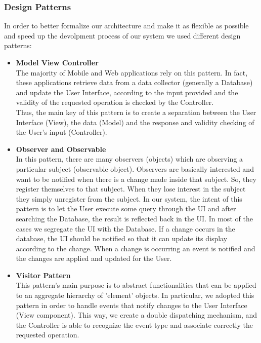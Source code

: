\documentclass[12pt,a4paper]{article}
\begin{document}
	\newpage
	\subsubsection{Design Patterns}
		In order to better formalize our architecture and make it as flexible as possible and speed up the devolpment process of our system we used different design patterns:
		\begin{itemize}
			\item \textbf{Model View Controller}\\ 
			The majority of Mobile and Web applications rely on this pattern. In fact, these applications retrieve data from a data collector (generally a Database) and update the User Interface, according to the input provided and the validity of the requested operation is checked by the Controller.\\
			Thus, the main key of this pattern is to create a separation between the User Interface (View), the data (Model) and the response and validity checking of the User's input (Controller).
			\item \textbf{Observer and Observable}\\
			In this pattern, there are many observers (objects) which are observing a particular subject (observable object). Observers are basically interested and want to be notified when there is a change made inside that subject. So, they register themselves to that subject. When they lose interest in the subject they simply unregister from the subject. In our system, the intent of this pattern is to let the User execute some query through the UI and after searching the Database, the result is reflected back in the UI. In most of the cases we segregate the UI with the Database. If a change occurs in the database, the UI should be notified so that it can update its display according to the change. When a change is occurring an event is notified and the changes are applied and updated for the User.
			\item \textbf{Visitor Pattern}\\
			This pattern's main purpose is to abstract functionalities that can be applied to an aggregate hierarchy of 'element' objects. In particular, we adopted this pattern in order to handle events that notify changes to the User Interface (View component). This way, we create a double dispatching mechanism, and the Controller is able to recognize the event type and associate correctly the requested operation.
		\end{itemize}
	
\end{document}
